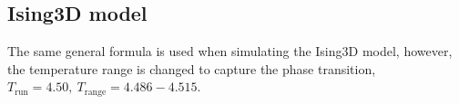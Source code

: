 \documentclass[a4paper]{article}
\newcommand{\trm}[1]{\textrm{#1}}
\begin{document}
\subsection{Ising3D model}
The same general formula is used when simulating the Ising3D model, however, the temperature range is changed to capture the phase transition, $T_{\trm{run}} = 4.50, ~ T_{\trm{range}} = 4.486-4.515$.




\end{document}
